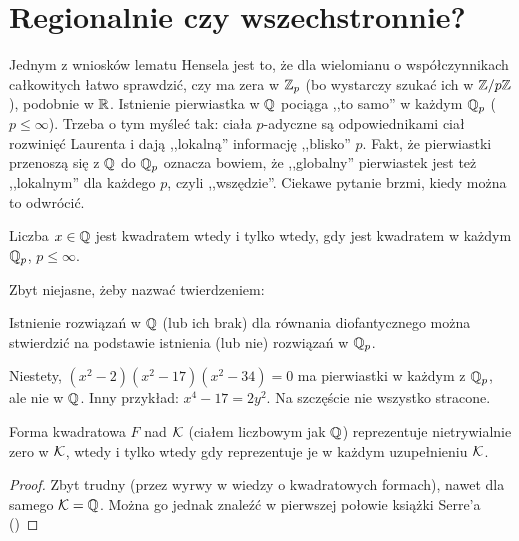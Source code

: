 \section{Regionalnie czy wszechstronnie?}
Jednym z wniosków lematu Hensela jest to, że dla wielomianu o współczynnikach całkowitych łatwo sprawdzić, czy ma zera w $\mathbb Z_p$ (bo wystarczy szukać ich w $\mathbb Z/p\mathbb Z$), podobnie w $\mathbb R$.
Istnienie pierwiastka w $\mathbb Q$ pociąga ,,to samo'' w każdym $\mathbb Q_p$ ($p \le \infty$).
Trzeba o tym myśleć tak: ciała $p$-adyczne są odpowiednikami ciał rozwinięć Laurenta i dają ,,lokalną'' informację ,,blisko'' $p$.
Fakt, że pierwiastki przenoszą się z $\mathbb Q$ do $\mathbb Q_p$ oznacza bowiem, że ,,globalny'' pierwiastek jest też ,,lokalnym'' dla każdego $p$, czyli ,,wszędzie''.
Ciekawe pytanie brzmi, kiedy można to odwrócić.

\begin{fakt}
	Liczba $x \in \mathbb Q$ jest kwadratem wtedy i tylko wtedy, gdy jest kwadratem w każdym $\mathbb Q_p$, $p \le \infty$.
\end{fakt}

Zbyt niejasne, żeby nazwać twierdzeniem:

\begin{fakt}
	Istnienie rozwiązań w $\mathbb Q$ (lub ich brak) dla równania diofantycznego można stwierdzić na podstawie istnienia (lub nie) rozwiązań w $\mathbb Q_p$.
\end{fakt}

Niestety, $(x^2 -2)(x^2-17)(x^2-34) = 0$ ma pierwiastki w każdym z $\mathbb Q_p$, ale nie w $\mathbb Q$. Inny przykład: $x^4 - 17 = 2y^2$. Na szczęście nie wszystko stracone.

\begin{twierdzenie}
	Forma kwadratowa $F$ nad $\mathcal K$ (ciałem liczbowym jak $\mathbb Q$) reprezentuje nietrywialnie zero w $\mathcal K$, wtedy i tylko wtedy gdy reprezentuje je w każdym uzupełnieniu $\mathcal K$.
\end{twierdzenie}

\begin{proof}
	Zbyt trudny (przez wyrwy w wiedzy o kwadratowych formach), nawet dla samego $\mathcal K = \mathbb Q$.
	Można go jednak znaleźć w pierwszej połowie książki Serre'a (\cite{serre73})
\end{proof}

\begin{historia}\end{historia}
\begin{historia}\end{historia}
\color{black}

